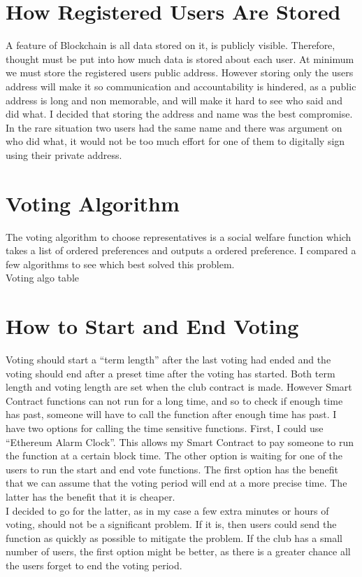 \section{How Registered Users Are Stored}
A feature of Blockchain is all data stored on it, is publicly visible. Therefore, thought must be put into how much data is stored about each user. At minimum we must store the registered users public address. However storing only the users address will make it so communication and accountability is hindered, as a public address is long and non memorable, and will make it hard to see who said and did what. I decided that storing the address and name was the best compromise. In the rare situation two users had the same name and there was argument on who did what, it would not be too much effort for one of them to digitally sign using their private address.
\section{Voting Algorithm}
The voting algorithm to choose representatives is a social welfare function which takes a list of ordered preferences and outputs a ordered preference. I compared a few algorithms to see which best solved this problem.
\\
Voting algo table
\section{How to Start and End Voting}
Voting should start a “term length” after the last voting had ended and the voting should end after a preset time after the voting has started. Both term length and voting length are set when the club contract is made. However Smart Contract functions can not run for a long time, and so to check if enough time has past, someone will have to call the function after enough time has past. I have two options for calling the time sensitive functions. First, I could use “Ethereum Alarm Clock”. This allows my Smart Contract to pay someone to run the function at a certain block time. The other option is waiting for one of the users to run the start and end vote functions. The first option has the benefit that we can assume that the voting period will end at a more precise time. The latter has the benefit that it is cheaper.
\\
I decided to go for the latter, as in my case a few extra minutes or hours of voting, should not be a significant problem. If it is, then users could send the function as quickly as possible to mitigate the problem. If the club has a small number of users, the first option might be better, as there is a greater chance all the users forget to end the voting period.
